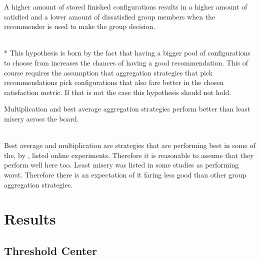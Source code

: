 \begin{hypothesis}
    \begin{itshape}
        \label{hyp:Evaluation:StoreSizeBetterResults} A higher amount of stored finished configurations results in a higher amount of satisfied and a lower amount of dissatisfied group members when the recommender is used to make the group decision.
    \end{itshape} \medskip \\*
    This hypothesis is born by the fact that having a bigger pool of configurations to choose from increases the chances of having a good recommendation. This of course requires the assumption that aggregation strategies that pick recommendations pick configurations that also fare better in the chosen satisfaction metric. If that is not the case this hypothesis should not hold.
\end{hypothesis}

\begin{hypothesis}
    \begin{itshape}
        \label{hyp:Evaluation:AggregationStrategies} Multiplication and best average aggregation strategies perform better than least misery across the board.
    \end{itshape} \medskip \\
    Best average and multiplication are strategies that are performing best in some of the, by \citeauthor{Masthoff2015} \cite[p. 755f]{Masthoff2015}, listed online experiments. Therefore it is reasonable to assume that they perform well here too. Least misery was listed in some studies as performing worst. Therefore there is an expectation of it faring less good than other group aggregation strategies.
\end{hypothesis}

\section{Results}
\label{sec:Evaluation:Findings}

\subsection{Threshold Center}

